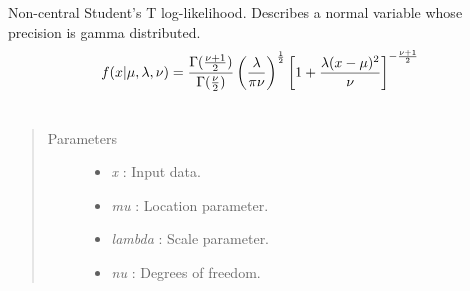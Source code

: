 \documentclass[letterpaper,10pt,english]{sphinxmanual}
\begin{document}
\begin{fulllineitems}
\label{distributions:pymc.distributions.noncentral_t_like}
Non-central Student's T log-likelihood. Describes a normal variable
whose precision is gamma distributed.
\begin{gather}
\begin{split}f(x|\mu,\lambda,\nu) = \frac{\Gamma(\frac{\nu +
1}{2})}{\Gamma(\frac{\nu}{2})}
\left(\frac{\lambda}{\pi\nu}\right)^{\frac{1}{2}}
\left[1+\frac{\lambda(x-\mu)^2}{\nu}\right]^{-\frac{\nu+1}{2}}\end{split}\notag\\\begin{split}\end{split}\notag
\end{gather}\begin{quote}\begin{description}
\item[{Parameters }] \leavevmode\begin{itemize}
\item {} 
\emph{x} : Input data.

\item {} 
\emph{mu} : Location parameter.

\item {} 
\emph{lambda} : Scale parameter.

\item {} 
\emph{nu} : Degrees of freedom.

\end{itemize}

\end{description}\end{quote}

\end{fulllineitems}

\end{document}
